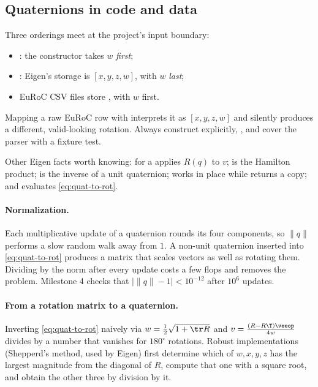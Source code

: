 \subsection{Quaternions in code and data}

\begin{pitfall}
Three orderings meet at the project's input boundary:
\begin{itemize}
  \item {}: the constructor takes $w$ \emph{first};
  \item {}: Eigen's storage is $[x, y, z, w]$, with $w$ \emph{last};
  \item EuRoC CSV files store , with $w$ first.
\end{itemize}
Mapping a raw EuRoC row with  interprets it as $[x,y,z,w]$ and silently
produces a different, valid-looking rotation. Always construct explicitly,
, and cover the parser with a fixture test.
\end{pitfall}

Other Eigen facts worth knowing:  for a  applies $R(q)$ to $v$;
 is the Hamilton product;  is the inverse of a unit quaternion;
 works in place while  returns a copy; and
 evaluates \eqref{eq:quat-to-rot}.

\paragraph{Normalization.} Each multiplicative update of a quaternion rounds its four components,
so $\|q\|$ performs a slow random walk away from $1$. A non-unit quaternion inserted into
\eqref{eq:quat-to-rot} produces a matrix that scales vectors as well as rotating them. Dividing by
the norm after every update costs a few flops and removes the problem. Milestone 4 checks that
$|\|q\| - 1| < 10^{-12}$ after $10^6$ updates.

\paragraph{From a rotation matrix to a quaternion.} Inverting \eqref{eq:quat-to-rot} naively via
$w = \tfrac12\sqrt{1 + \tr R}$ and $v = \frac{(R - R\T)\veeop}{4w}$ divides by a number that vanishes
for $180^\circ$ rotations. Robust implementations (Shepperd's method, used by Eigen) first determine
which of $w, x, y, z$ has the largest magnitude from the diagonal of $R$, compute that one with a
square root, and obtain the other three by division by it.

